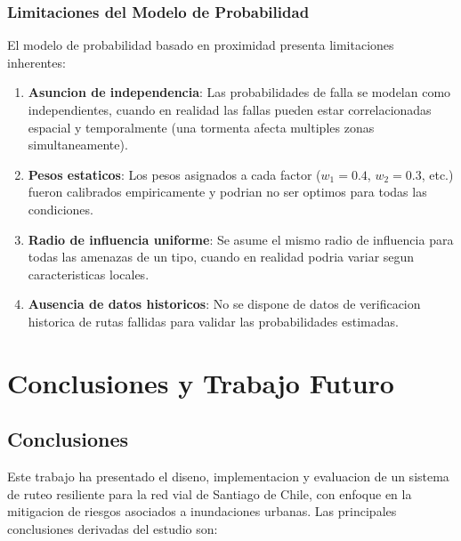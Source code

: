 \documentclass[conference]{IEEEtran}
\begin{document}
\subsubsection{Limitaciones del Modelo de Probabilidad}

El modelo de probabilidad basado en proximidad presenta limitaciones inherentes:

\begin{enumerate}
    \item \textbf{Asuncion de independencia}: Las probabilidades de falla se modelan como independientes, cuando en realidad las fallas pueden estar correlacionadas espacial y temporalmente (una tormenta afecta multiples zonas simultaneamente).

    \item \textbf{Pesos estaticos}: Los pesos asignados a cada factor ($w_1=0.4$, $w_2=0.3$, etc.) fueron calibrados empiricamente y podrian no ser optimos para todas las condiciones.

    \item \textbf{Radio de influencia uniforme}: Se asume el mismo radio de influencia para todas las amenazas de un tipo, cuando en realidad podria variar segun caracteristicas locales.

    \item \textbf{Ausencia de datos historicos}: No se dispone de datos de verificacion historica de rutas fallidas para validar las probabilidades estimadas.
\end{enumerate}

\section{Conclusiones y Trabajo Futuro}

\subsection{Conclusiones}

Este trabajo ha presentado el diseno, implementacion y evaluacion de un sistema de ruteo resiliente para la red vial de Santiago de Chile, con enfoque en la mitigacion de riesgos asociados a inundaciones urbanas. Las principales conclusiones derivadas del estudio son:
\end{document}
